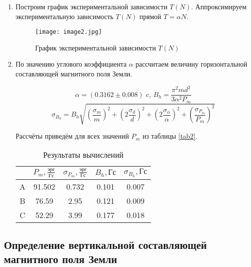 \documentclass[a4paper,12pt]{article} %
\begin{document}
\begin{enumerate}
\item Построим график экспериментальной зависимости $T(N)$. Аппроксимируем экспериментальную зависимость $T(N)$ прямой $T=\alpha N$.

\begin{figure}[h]
    \begin{center}
		\texttt{[image: image2.jpg]}
    \end{center}
	\caption{График экспериментальной зависимости $T(N)$}
	\label{plot4}
    \end{figure}

\item По значению углового коэффициента $\alpha$ рассчитаем величину горизонтальной составляющей магнитного поля Земли.

\[ \alpha = (0.3162 \pm 0.008) \text{ c, } B_h = \frac{\pi^2md^2}{3\alpha^2P_m}  \]
\[ \sigma_{B_h} = B_h\sqrt{\left(\frac{\sigma_m}{m}\right)^2+\left(2\frac{\sigma_d}{d}\right)^2+\left(2\frac{\sigma_{\alpha}}{\alpha}\right)^2+\left(\frac{\sigma_{P_m}}{P_m}\right)^2} \]

Рассчёты приведём для всех значений $P_m$ из таблицы \ref{tab2}.

\begin{table}[h]
\centering
    \begin{tabular}{|c|c|c|c|c|}
        \hline
        \text{ } & $P_m, \frac{\text{эрг}}{\text{Гс}}$ & $\sigma_{P_m}, \frac{\text{эрг}}{\text{Гс}}$ & $B_h, \text{Гс}$ & $\sigma_{B_h}, \text{Гс}$ \\ \hline
            A & 91.502 & 0.732 & 0.101 & 0.007 \\ \hline
            B & 76.59 & 2.95 & 0.121 & 0.009 \\ \hline
            C & 52.29 & 3.99 & 0.177 & 0.018 \\ \hline
    \end{tabular}
    \label{tab4}
    \caption{Результаты вычислений}
\end{table}    
\end{enumerate}

\subsection{Определение вертикальной составляющей магнитного поля Земли}
\end{document}
